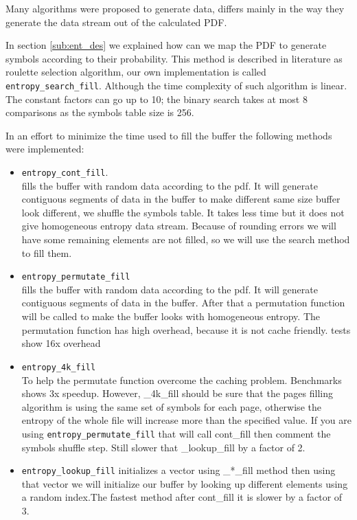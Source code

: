 Many algorithms were proposed to generate data, differs mainly in the way they generate the data stream out of the calculated PDF.

In section \ref{sub:ent_des} we explained how can we map the PDF to generate symbols according to their probability. This method is described in literature as roulette selection algorithm, our own implementation is called
 \verb+entropy_search_fill+. Although the time complexity of such algorithm is linear. The constant factors can go up to 10; the binary search takes at most 8 comparisons as the symbols table size is 256.


In an effort to minimize the time used to fill the buffer the following methods were implemented:

\begin{itemize}
\item \verb+entropy_cont_fill+. \\
   fills the buffer with random data according to
    the pdf. It will generate contiguous segments of data in the
    buffer to make different same size buffer look different, we
    shuffle the symbols table. It takes less time but it does not
    give homogeneous entropy data stream. Because of rounding errors
    we will have some remaining elements are not filled, so we will
    use the search method to fill them.
\item \verb+entropy_permutate_fill+\\
    fills the buffer with random data according to
    the pdf. It will generate contiguous segments of data in the
    buffer. After that a permutation function will be called to make
    the buffer looks with homogeneous entropy. The permutation
    function has high overhead, because it is not cache friendly.
    tests show 16x overhead

\item \verb+entropy_4k_fill+ \\
    To help the permutate function overcome the caching problem. Benchmarks
    shows 3x speedup. However, _4k_fill should be sure that the pages filling
    algorithm is using the same set of symbols for each page, otherwise the
    entropy of the whole file will increase more than the specified value. If
    you are using \verb+entropy_permutate_fill+ that will call cont_fill then comment the 
    symbols shuffle step. Still slower that _lookup_fill by a factor of 2.

\item \verb+entropy_lookup_fill+
    initializes a vector using _*_fill method then
    using that vector we will initialize our buffer by looking up
    different elements using a random index.The fastest method 
    after cont_fill it is slower by a factor of 3.
\end{itemize}


